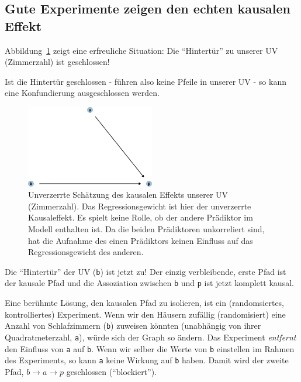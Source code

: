 \documentclass[
  a4paper,
  DIV=11]{scrreprt}
\theoremstyle{definition}
\theoremstyle{remark}
\begin{document}
\hypertarget{gute-experimente-zeigen-den-echten-kausalen-effekt}{%
\subsection{Gute Experimente zeigen den echten kausalen
Effekt}\label{gute-experimente-zeigen-den-echten-kausalen-effekt}}

Abbildung~\ref{fig-dag-tuer-zu} zeigt eine erfreuliche Situation: Die
``Hintertür'' zu unserer UV (Zimmerzahl) ist geschlossen!

Ist die Hintertür geschlossen - führen also keine Pfeile in unserer UV -
so kann eine Konfundierung ausgeschlossen werden.

\begin{figure}

{\centering \includegraphics[width=0.5\textwidth,height=\textheight]{./kausal_files/figure-pdf/fig-dag-tuer-zu-1.pdf}

}

\caption{\label{fig-dag-tuer-zu}Unverzerrte Schätzung des kausalen
Effekts unserer UV (Zimmerzahl). Das Regressionsgewicht ist hier der
unverzerrte Kausaleffekt. Es spielt keine Rolle, ob der andere Prädiktor
im Modell enthalten ist. Da die beiden Prädiktoren unkorreliert sind,
hat die Aufnahme des einen Prädiktors keinen Einfluss auf das
Regressionsgewicht des anderen.}

\end{figure}

Die ``Hintertür'' der UV (\texttt{b}) ist jetzt zu! Der einzig
verbleibende, erste Pfad ist der kausale Pfad und die Assoziation
zwischen \texttt{b} und \texttt{p} ist jetzt komplett kausal.

Eine berühmte Lösung, den kausalen Pfad zu isolieren, ist ein
(randomsiertes, kontrolliertes) Experiment. Wenn wir den Häusern
zufällig (randomisiert) eine Anzahl von Schlafzimmern (\texttt{b})
zuweisen könnten (unabhängig von ihrer Quadratmeterzahl, \texttt{a}),
würde sich der Graph so ändern. Das Experiment \emph{entfernt} den
Einfluss von \texttt{a} auf \texttt{b}. Wenn wir selber die Werte von
\texttt{b} einstellen im Rahmen des Experiments, so kann \texttt{a}
keine Wirkung auf \texttt{b} haben. Damit wird der zweite Pfad,
\(b \rightarrow a \rightarrow p\) geschlossen (``blockiert'').
\end{document}
